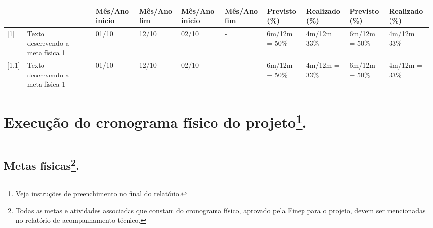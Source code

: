 \documentclass[a4paper,12pt]{article}
\begin{document}
\begin{landscape}
\begin{table}[h]
{\begin{tabular}{|p{2cm}|p{3cm}|p{4cm}|p{3cm}|p{2cm}|p{2cm}|p{2cm}|p{2cm}|p{2cm}|p{2cm}|p{2cm}|p{2cm}|}
    \rowcolor{lightgray}
    & & & & 
    \textbf{Mês/Ano inicio} & \textbf{Mês/Ano fim} &
    \textbf{Mês/Ano inicio} & \textbf{Mês/Ano fim} &
    \textbf{Previsto (\%)} & \textbf{Realizado (\%)} & \textbf{Previsto (\%)} & \textbf{Realizado (\%)} 
    \\ \hline


    [1] & 
    Texto descrevendo a meta física 1 
    &
    &
    & 01/10 
    & 12/10 
    & 02/10 
    & - & 
    6m/12m = 50\% & 
    4m/12m = 33\% & 
    6m/12m = 50\% &
    4m/12m = 33\% \\
    \hline

    [1.1] & 
    Texto descrevendo a meta física 1 
    &
    &
    & 01/10 
    & 12/10 
    & 02/10 
    & - & 
    6m/12m = 50\% & 
    4m/12m = 33\% & 
    6m/12m = 50\% &
    4m/12m = 33\% \\
    \hline 
\end{tabular}}\end{table}
 


\end{landscape}
\restoregeometry %
\newpage


\section{Execução do cronograma físico do projeto\protect\footnote[2]{Veja instruções de preenchimento no final do relatório.}.}
\vspace{-0.8cm} %
    \rule{\textwidth}{2pt} %
\subsection{Metas físicas\protect\footnote[3]{Todas as metas e atividades associadas que constam do cronograma físico, aprovado pela Finep para o projeto, devem ser mencionadas no relatório de acompanhamento técnico.}.}
\end{document}
